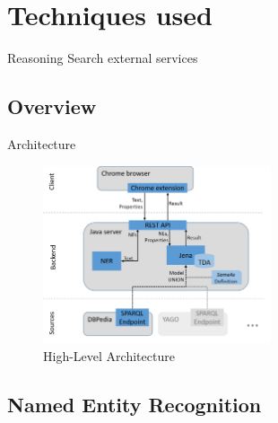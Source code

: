 \documentclass[11pt,titlepage,oneside,openany]{article}
\begin{document}
\section{Techniques used} 
Reasoning
Search
external services


\subsection{Overview}
Architecture 

\begin{figure}[ht]
	\centering
	\includegraphics[width=0.6\textwidth]{architecture}
	\caption{High-Level Architecture}
	\label{fig:architecture}
\end{figure}



\subsection{Named Entity Recognition}
\end{document}
